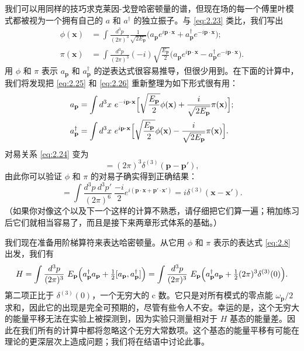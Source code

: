 我们可以用同样的技巧求克莱因-戈登哈密顿量的谱，但现在场的每一个傅里叶模式都被视为一个拥有自己的 $a$ 和 $a^\dagger$ 的独立振子。与 \eqref{eq:2.23} 类比，我们写出
\begin{align}
  \phi(\mathbf{x}) &= \int \frac{d^3p}{(2\pi)^3}
    \frac{1}{\sqrt{2E_{\mathbf{p}}}}
    \bigl( a_{\mathbf{p}}e^{i\mathbf{p}\cdot\mathbf{x}}
      + a_{\mathbf{p}}^\dagger e^{-i\mathbf{p}\cdot\mathbf{x}} \bigr);
  \label{eq:2.25}\\
  \pi(\mathbf{x}) &= \int \frac{d^3p}{(2\pi)^3}
    (-i)\sqrt{\frac{E_{\mathbf{p}}}{2}}
    \bigl( a_{\mathbf{p}}e^{i\mathbf{p}\cdot\mathbf{x}}
      - a_{\mathbf{p}}^\dagger e^{-i\mathbf{p}\cdot\mathbf{x}} \bigr).
  \label{eq:2.26}
\end{align}
用 $\phi$ 和 $\pi$ 表示 $a_{\mathbf{p}}$ 和 $a_{\mathbf{p}}^\dagger$ 的逆表达式很容易推导，但很少用到。在下面的计算中，我们将发现把 \eqref{eq:2.25} 和 \eqref{eq:2.26} 重新整理为如下形式很有用：
\begin{align}
  a_{\mathbf{p}} &= \int d^3x\ e^{-i\mathbf{p}\cdot\mathbf{x}}
    \Bigl[ \sqrt{\frac{E_{\mathbf{p}}}{2}}\phi(\mathbf{x})
      + \frac{i}{\sqrt{2E_{\mathbf{p}}}}\pi(\mathbf{x}) \Bigr];
  \label{eq:2.27}\\
  a_{\mathbf{p}}^\dagger &= \int d^3x\ e^{i\mathbf{p}\cdot\mathbf{x}}
    \Bigl[ \sqrt{\frac{E_{\mathbf{p}}}{2}}\phi(\mathbf{x})
      - \frac{i}{\sqrt{2E_{\mathbf{p}}}}\pi(\mathbf{x}) \Bigr].
  \label{eq:2.28}
\end{align}
对易关系 \eqref{eq:2.24} 变为
\begin{equation}
  [a_{\mathbf{p}}, a_{\mathbf{p}'}^\dagger]
    = (2\pi)^3\delta^{(3)}(\mathbf{p}-\mathbf{p}'),
  \label{eq:2.29}
\end{equation}
由此你可以验证 $\phi$ 和 $\pi$ 的对易子确实得到正确结果：
\begin{equation}
  [\phi(\mathbf{x}), \pi(\mathbf{x}')]
  = \int \frac{d^3p\ d^3p'}{(2\pi)^6}\ \frac{-i}{2}
    e^{i(\mathbf{p}\cdot\mathbf{x}+\mathbf{p}'\cdot\mathbf{x}')}
  = i\delta^{(3)}(\mathbf{x}-\mathbf{x}').
  \label{eq:2.30}
\end{equation}
（如果你对像这个以及下一个这样的计算不熟悉，请仔细把它们算一遍；稍加练习后它们就相当容易了，而且是接下来两章形式体系的基础。）

我们现在准备用阶梯算符来表达哈密顿量。从它用 $\phi$ 和 $\pi$ 表示的表达式 \eqref{eq:2.8} 出发，我们有
\begin{equation}
  H = \int \frac{d^3p}{(2\pi)^3}\ E_{\mathbf{p}}
    \Bigl( a_{\mathbf{p}}^\dagger a_{\mathbf{p}}
      + \tfrac{1}{2}[a_{\mathbf{p}}, a_{\mathbf{p}}^\dagger] \Bigr)
  = \int \frac{d^3p}{(2\pi)^3}\ E_{\mathbf{p}}
    \Bigl( a_{\mathbf{p}}^\dagger a_{\mathbf{p}}
      + \tfrac{1}{2}(2\pi)^3\delta^{(3)}(0) \Bigr).
  \label{eq:2.31}
\end{equation}
第二项正比于 $\delta^{(3)}(0)$，一个无穷大的 c 数。它只是对所有模式的零点能 $\omega_{\mathbf{p}}/2$ 求和，因此它的出现是完全可预期的，尽管有些令人不安。幸运的是，这个无穷大的能量平移无法在实验上被探测到，因为实验只测量相对于 $H$ 基态的能量差。因此在我们所有的计算中都将忽略这个无穷大常数项。这个基态的能量平移有可能在理论的更深层次上造成问题；我们将在结语中讨论此事。

